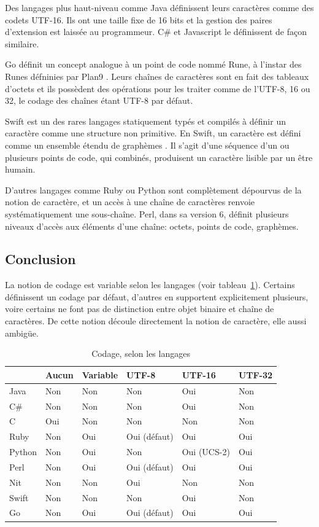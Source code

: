 Des langages plus haut-niveau comme Java \cite{java_spec} définissent leurs caractères comme
des codets UTF-16.
Ils ont une taille fixe de 16 bits et la gestion des paires d'extension est laissée
au programmeur.
C\# \cite{csharp_spec} et Javascript \cite{ecmascript_spec} le définissent de façon similaire.

Go \cite{goref} définit un concept analogue à un point de code nommé
Rune, à l'instar des Runes défninies par Plan9 \cite{Plan9}.
Leurs chaînes de caractères sont en fait des tableaux d'octets et ils
possèdent des opérations pour les traiter comme de l'UTF-8, 16 ou 32, le codage des chaînes
étant UTF-8 par défaut.

Swift \cite{swiftref} est un des rares langages statiquement typés et compilés à définir un
caractère comme une structure non primitive.
En Swift, un caractère est défini comme un ensemble étendu de graphèmes \cite{Unicode8}.
Il s'agit d'une séquence d'un ou plusieurs points de code, qui
combinés, produisent un caractère lisible par un être humain.

D'autres langages comme Ruby ou Python sont complètement dépourvus de la notion de
caractère, et un accès à une chaîne de caractères renvoie systématiquement
une sous-chaîne.
Perl, dans sa version 6, définit plusieurs niveaux d'accès aux éléments d'une chaîne:
octets, points de code, graphèmes.

\subsection{Conclusion}

La notion de codage est variable selon les langages (voir tableau~\ref{coding_recap}).
Certains définissent un codage par défaut, d'autres en supportent explicitement
plusieurs, voire certains ne font pas de distinction entre objet binaire et chaîne
de caractères.
De cette notion découle directement la notion de caractère, elle aussi ambigüe.

\begin{table}
	\caption{\label{coding_recap}Codage, selon les langages}
	\centering
	\begin{tabular}{llllll}
		\hline
		& Aucun & Variable & UTF-8 & UTF-16 & UTF-32 \\
		\hline
		Java & Non & Non & Non & Oui & Non \\
		C\# & Non & Non & Non & Oui & Non \\
		C & Oui & Non & Non & Non & Non \\
		Ruby & Non & Oui & Oui (défaut) & Oui & Oui \\
		Python & Non & Oui & Non & Oui (UCS-2) & Oui \\
		Perl & Non & Oui & Oui (défaut) & Oui & Oui \\
		Nit & Non & Non & Oui & Non & Non \\
		Swift & Non & Non & Non & Oui & Non \\
		Go & Non & Oui & Oui (défaut) & Oui & Oui \\
		\hline
	\end{tabular}
\end{table}

